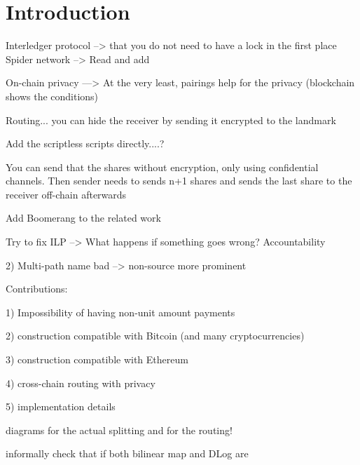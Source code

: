 \section{Introduction}

Interledger protocol --> that you do not need to have a lock in the first place
Spider network --> Read and add

On-chain privacy ---> At the very least, pairings help for the privacy (blockchain shows the conditions)

Routing... you can hide the receiver by sending it encrypted to the landmark

Add the scriptless scripts directly....?

You can send that the shares without encryption, only using confidential channels. Then sender needs to sends n+1 shares and sends the last share to the receiver off-chain afterwards

Add Boomerang to the related work

Try to fix ILP --> What happens if something goes wrong? Accountability


 2) Multi-path name bad --> non-source more prominent

Contributions:


 1) Impossibility of having non-unit amount payments

 2) construction compatible with Bitcoin (and many cryptocurrencies)

 3) construction compatible with Ethereum 

 4) cross-chain routing with privacy

 5) implementation details
 
 
 diagrams for the actual splitting and for the routing!
 
 informally check that if both bilinear map and DLog are 